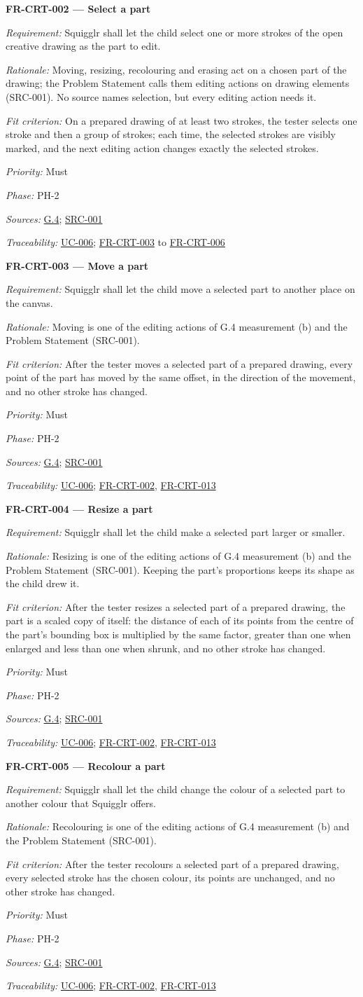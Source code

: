 \documentclass[12pt]{article}
\renewcommand{\_}{\textunderscore\allowbreak}%
\newcommand{\goalref}[1]{\hyperref[goal:#1]{G.#1}}
\newcommand{\ucref}[1]{\hyperref[uc:#1]{\mbox{UC-#1}}}
\newenvironment{srsrequirement}[2]{%
  \par\medskip\noindent\phantomsection\label{req:#1}%
  \textbf{#1 --- #2}\par\nobreak\smallskip }{\par\medskip}
\newcommand{\reqfield}[2]{\noindent\textit{#1:} #2\par}
\newcommand{\reqshall}[1]{\reqfield{Requirement}{#1}}
\newcommand{\reqrationale}[1]{\reqfield{Rationale}{#1}}
\newcommand{\reqfit}[1]{\reqfield{Fit criterion}{#1}}
\newcommand{\reqpriority}[1]{\reqfield{Priority}{#1}}
\newcommand{\reqphase}[1]{\reqfield{Phase}{#1}}
\newcommand{\reqsources}[1]{\reqfield{Sources}{#1}}
\newcommand{\reqtraces}[1]{\reqfield{Traceability}{#1}}
\newcommand{\reqref}[1]{\hyperref[req:#1]{#1}}
\newcommand{\srcref}[1]{\hyperref[src:#1]{SRC-#1}}
\providecommand{\ucref}[1]{\hyperref[uc:#1]{UC-#1}}
\begin{document}
\begin{srsrequirement}{FR-CRT-002}{Select a part}
  \reqshall{Squigglr shall let the child select one or more strokes of the open
creative drawing as the part to edit.} \reqrationale{Moving, resizing,
recolouring and erasing act on a chosen part of the drawing; the Problem
Statement calls them editing actions on drawing elements (SRC-001). No source
names selection, but every editing action needs it.} \reqfit{On a prepared
drawing of at least two strokes, the tester selects one stroke and then a group
of strokes; each time, the selected strokes are visibly marked, and the next
editing action changes exactly the selected strokes.}
  \reqpriority{Must}
  \reqphase{PH-2}
  \reqsources{\goalref{4}; \srcref{001}} \reqtraces{\ucref{006};
  \reqref{FR-CRT-003} to \reqref{FR-CRT-006}}
\end{srsrequirement}

\begin{srsrequirement}{FR-CRT-003}{Move a part}
  \reqshall{Squigglr shall let the child move a selected part to another place
on the canvas.} \reqrationale{Moving is one of the editing actions of G.4
measurement (b) and the Problem Statement (SRC-001).} \reqfit{After the tester
moves a selected part of a prepared drawing, every point of the part has moved
by the same offset, in the direction of the movement, and no other stroke has
changed.}
  \reqpriority{Must}
  \reqphase{PH-2}
  \reqsources{\goalref{4}; \srcref{001}} \reqtraces{\ucref{006};
  \reqref{FR-CRT-002}, \reqref{FR-CRT-013}}
\end{srsrequirement}

\begin{srsrequirement}{FR-CRT-004}{Resize a part}
  \reqshall{Squigglr shall let the child make a selected part larger or smaller.}
  \reqrationale{Resizing is one of the editing actions of G.4 measurement (b)
and the Problem Statement (SRC-001). Keeping the part's proportions keeps its
shape as the child drew it.} \reqfit{After the tester resizes a selected part of
a prepared drawing, the part is a scaled copy of itself: the distance of each of
its points from the centre of the part's bounding box is multiplied by the same
factor, greater than one when enlarged and less than one when shrunk, and no
other stroke has changed.}
  \reqpriority{Must}
  \reqphase{PH-2}
  \reqsources{\goalref{4}; \srcref{001}} \reqtraces{\ucref{006};
  \reqref{FR-CRT-002}, \reqref{FR-CRT-013}}
\end{srsrequirement}

\begin{srsrequirement}{FR-CRT-005}{Recolour a part}
  \reqshall{Squigglr shall let the child change the colour of a selected part to
another colour that Squigglr offers.} \reqrationale{Recolouring is one of the
editing actions of G.4 measurement (b) and the Problem Statement (SRC-001).}
\reqfit{After the tester recolours a selected part of a prepared drawing, every
selected stroke has the chosen colour, its points are unchanged, and no other
stroke has changed.}
  \reqpriority{Must}
  \reqphase{PH-2}
  \reqsources{\goalref{4}; \srcref{001}} \reqtraces{\ucref{006};
  \reqref{FR-CRT-002}, \reqref{FR-CRT-013}}
\end{srsrequirement}
\end{document}
